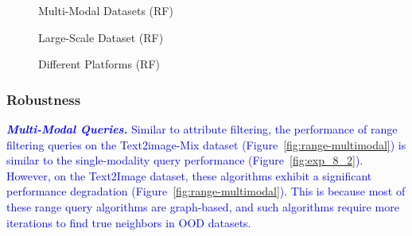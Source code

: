 \documentclass[sigconf, nonacm]{acmart}
\begin{document}
{\begin{figure}
	\centering
	\begin{minipage}[t]{0.37\textwidth}
		\centering
		\setlength{\abovecaptionskip}{-0.2cm}
		\setlength{\belowcaptionskip}{-0.3cm}
		\caption{Multi-Modal Datasets (RF)}
		\label{fig:range-multimodal} 
	\end{minipage}%
	\hfill
	\begin{minipage}[t]{0.27\textwidth}
		\centering
		\setlength{\abovecaptionskip}{-0.2cm}
		\setlength{\belowcaptionskip}{-0.3cm}
		\caption{Large-Scale Dataset (RF)}
		\label{fig: range big dataset}
	\end{minipage}
	\hfill %
	\begin{minipage}[t]{0.35\textwidth}
		\centering
		\setlength{\abovecaptionskip}{-0.2cm}
		\setlength{\belowcaptionskip}{-0.3cm}
		\caption{Different Platforms (RF)}
		\label{fig:range-cross-platform}
	\end{minipage}%
	
\end{figure}
	
	\subsubsection{Robustness}
	
	\textit{\textbf{\textcolor{blue}{Multi-Modal Queries.}}}
	\textcolor{blue}{
		Similar to attribute filtering, the performance of range filtering queries on the Text2image-Mix dataset (Figure~\ref{fig:range-multimodal}) is similar to the single-modality query performance (Figure~\ref{fig:exp_8_2}). However, on the Text2Image dataset, these algorithms exhibit a significant performance degradation (Figure~\ref{fig:range-multimodal}). This is because most of these range query algorithms are graph-based, and such algorithms require more iterations to find true neighbors in OOD datasets.
		}
		
}
\end{document}
